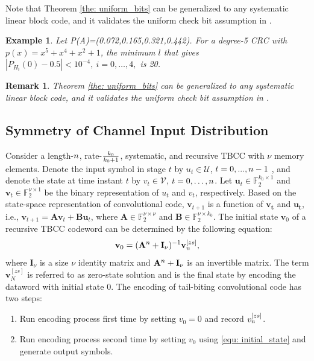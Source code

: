 \documentclass [PhD] {uclathes}
\newtheorem{example}{Example}
\newtheorem*{remark}{Remark}
\begin{document}
Note that Theorem \ref{the: uniform_bits} can be generalized to any systematic linear block code, and it validates the uniform check bit assumption in \cite{pas_bocherer_1}.

\begin{example}
    Let P(A)=(0.072,0.165,0.321,0.442).  For a degree-5 CRC with $p(x)=x^5+x^4+x^2+1$, the minimum $l$ that gives $|P_{H_i}(0)-0.5|<10^{-4},~i=0,\dots,4,$ is 20. 
\end{example}
\begin{remark}
Theorem \ref{the: uniform_bits} can be generalized to any systematic linear block code, and it validates the uniform check bit assumption in \cite{pas_bocherer_1}. 
\end{remark}

\subsection{Symmetry of Channel Input Distribution}
Consider a length-$n$, rate-$\frac{k_0}{k_0+1}$, systematic, and recursive TBCC with $\nu$ memory elements.
Denote the input symbol in stage $t$ by $u_t\in\mathcal{U}$, $t=0,...,n-1$ , and denote the state at time instant $t$ by $v_t\in\mathcal{V}$, $t=0,\ldots,n$.
Let $\mathbf{u}_t\in\mathbb{F}_2^{k_0\times1}$ and $\mathbf{v}_t\in\mathbb{F}_2^{\nu\times 1}$ be the binary representation of $u_t$ and $v_t$, respectively.
Based on the state-space representation of convolutional code\cite{weiss2001code,fragouli1999convolutional}, $\mathbf{v}_{t+1}$ is a function of $\mathbf{v_t}$ and  $\mathbf{u_t}$, i.e., $\mathbf{v}_{t+1}=\mathbf{A}\mathbf{v}_t+\mathbf{B}\mathbf{u}_t$, where $\mathbf{A}\in\mathbb{F}_2^{\nu\times\nu}$ and $\mathbf{B}\in\mathbb{F}_2^{\nu\times k_0}$. 
The initial state $\mathbf{v}_0$ of a recursive TBCC codeword can be determined by the following equation:
\begin{align}\label{equ: initial_state}
    \mathbf{v}_0=(\mathbf{A}^{n}+\mathbf{I}_\nu)^{-1}\mathbf{v}_n^{[zs]},
\end{align}
where $\mathbf{I}_\nu$ is a size $\nu$ identity matrix and $\mathbf{A}^n+\mathbf{I}_{\nu}$ is an invertible matrix\cite{weiss2001code}. The term $\mathbf{{v}}_N^{[zs]}$ is referred to as zero-state solution and is the final state by encoding the dataword with initial state ${0}$.  The encoding of tail-biting convolutional code has two steps: 

\begin{enumerate}
    \item Run encoding process first time by setting $v_0=0$ and record ${{v}}_n^{[zs]}$.
    \item Run encoding process second time by setting ${v}_0$ using \eqref{equ: initial_state} and generate output symbols.
\end{enumerate}
\end{document}
